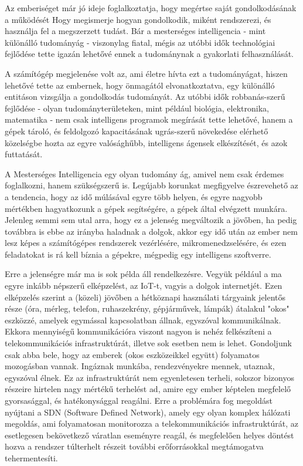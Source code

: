 \label{Chap:bevezetes}


Az emberiséget már jó ideje foglalkoztatja, hogy megértse saját gondolkodásának a működését Hogy megismerje hogyan gondolkodik, miként rendszerezi, és használja fel a megszerzett tudást. Bár a mesterséges intelligencia - mint különálló tudományág - viszonylag fiatal, mégis az utóbbi idők technológiai fejlődése tette igazán lehetővé ennek a tudománynak a gyakorlati felhasználását. \ujsor

A számítógép megjelenése volt az, ami életre hívta ezt a tudományágat, hiszen lehetővé tette az embernek, hogy önmagától elvonatkoztatva, egy különálló entitáson vizsgálja a gondolkodás tudományát. Az utóbbi idők robbanás-szerű fejlődése - olyan tudományterületeken, mint például biológia, elektronika, matematika - nem csak intelligens programok megírását tette lehetővé, hanem a gépek tároló, és feldolgozó kapacitásának ugrás-szerű növekedése elérhető közelségbe hozta az egyre valósághűbb, intelligens ágensek elkészítését, és azok futtatását. \ujsor

A Mesterséges Intelligencia egy olyan tudomány ág, amivel nem csak érdemes foglalkozni, hanem szükségszerű is. Legújabb korunkat megfigyelve észrevehető az a tendencia, hogy az idő múlásával egyre több helyen, és egyre nagyobb mértékben hagyatkozunk a gépek segítségére, a gépek által elvégzett munkára. Jelenleg semmi sem utal arra, hogy ez a jelenség megváltozik a jövőben, ha pedig továbbra is ebbe az irányba haladnak a dolgok, akkor egy idő után az ember nem lesz képes a számítógépes rendszerek vezérlésére, mikromenedzselésére, és ezen feladatokat is rá kell bíznia a gépekre, mégpedig egy intelligens szoftverre. \ujsor

Erre a jelenségre már ma is sok példa áll rendelkezésre. Vegyük például a ma egyre inkább népszerű elképzelést, az IoT-t, vagyis a dolgok internetjét. Ezen elképzelés szerint a (közeli) jövőben a hétköznapi használati tárgyaink jelentős része (óra, mérleg, telefon, ruhaszekrény, gépjárművek, lámpák) átalakul "okos" eszközzé, amelyek egymással kapcsolatban állnak, egyszóval kommunikálnak. Ekkora mennyiségű kommunikációra viszont nagyon is nehéz felkészíteni a telekommunikációs infrastruktúrát, illetve sok esetben nem is lehet. Gondoljunk csak abba bele, hogy az emberek (okos eszközeikkel együtt) folyamatos mozogásban vannak. Ingáznak munkába, rendezvényekre mennek, utaznak, egyszóval élnek. Ez az infrastruktúrát nem egyenletesen terheli, sokszor bizonyos részeire hirtelen nagy mértékű terhelést ad, amire egy ember képtelen megfelelő gyorsasággal, és hatékonysággal reagálni. Erre a problémára fog megoldást nyújtani a SDN (Software Defined Network), amely egy olyan komplex hálózati megoldás, ami folyamatosan monitorozza a telekommunikációs infrastruktúrát, az esetlegesen bekövetkező váratlan eseményre reagál, és megfelelően helyes döntést hozva a rendszer túlterhelt részeit további erőforrásokkal megtámogatva tehermentesíti. \ujsor

